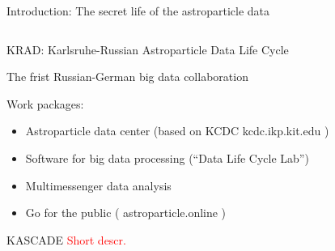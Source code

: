 \documentclass[18pt]{beamer}
\begin{document}
\begin{frame}{Introduction: The secret life of the astroparticle data}
\begin{columns}
\begin{column}[t]{0.53\textwidth}
  \end{column}
\end{columns}
\end{frame}

\begin{frame}{\textcolor{kit-green100}{KRAD}: \textcolor{kit-green100}{K}arlsruhe-\textcolor{kit-green100}{R}ussian \textcolor{kit-green100}{A}stroparticle \textcolor{kit-green100}{D}ata Life Cycle}
\vspace{-1em}
    \begin{figure}[h]
    \label{ris:image}
    \end{figure}
The frist Russian-German big data collaboration

\end{frame}

\begin{frame}
Work packages:
\begin{itemize}
 \item Astroparticle data center (based on KCDC kcdc.ikp.kit.edu )
 \item Software for big data processing (“Data Life Cycle Lab”)
 \item Multimessenger data analysis
 \item Go for the public ( astroparticle.online )
\end{itemize}
\end{frame}

\begin{frame}{KASCADE}
\textcolor{red}{Short descr.}
\end{frame}
\end{document}
